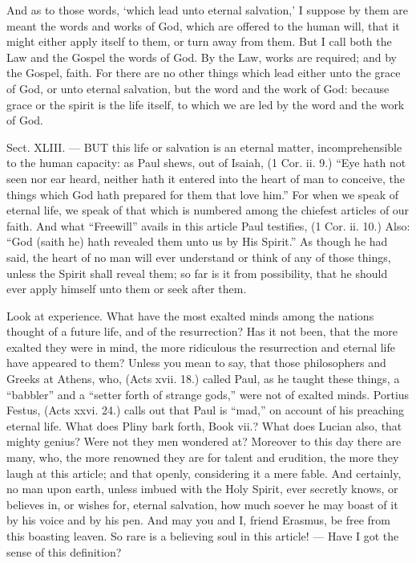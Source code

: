 And as to those words, ‘which lead unto eternal salvation,’ I suppose by them are meant the words and works of God, which are offered to the human will, that it might either apply itself to them, or turn away from them. But I call both the Law and the Gospel the words of God. By the Law, works are required; and by the Gospel, faith. For there are no other things which lead either unto the grace of God, or unto eternal salvation, but the word and the work of God: because grace or the spirit is the life itself, to which we are led by the word and the work of God.


Sect. XLIII. — BUT this life or salvation is an eternal matter, incomprehensible to the human capacity: as Paul shews, out of Isaiah, (1 Cor. ii. 9.) “Eye hath not seen nor ear heard, neither hath it entered into the heart of man to conceive, the things which God hath prepared for them that love him.” For when we speak of eternal life, we speak of that which is numbered among the chiefest articles of our faith. And what “Freewill” avails in this article Paul testifies, (1 Cor. ii. 10.) Also: “God (saith he) hath revealed them unto us by His Spirit.” As though he had said, the heart of no man will ever understand or think of any of those things, unless the Spirit shall reveal them; so far is it from possibility, that he should ever apply himself unto them or seek after them.

Look at experience. What have the most exalted minds among the nations thought of a future life, and of the resurrection? Has it not been, that the more exalted they were in mind, the more ridiculous the resurrection and eternal life have appeared to them? Unless you mean to say, that those philosophers and Greeks at Athens, who, (Acts xvii. 18.) called Paul, as he taught these things, a “babbler” and a “setter forth of strange gods,” were not of exalted minds. Portius Festus, (Acts xxvi. 24.) calls out that Paul is “mad,” on account of his preaching eternal life. What does Pliny bark forth, Book vii.? What does Lucian also, that mighty genius? Were not they men wondered at? Moreover to this day there are many, who, the more renowned they are for talent and erudition, the more they laugh at this article; and that openly, considering it a mere fable. And certainly, no man upon earth, unless imbued with the Holy Spirit, ever secretly knows, or believes in, or wishes for, eternal salvation, how much soever he may boast of it by his voice and by his pen. And may you and I, friend Erasmus, be free from this boasting leaven. So rare is a believing soul in this article! — Have I got the sense of this definition?


